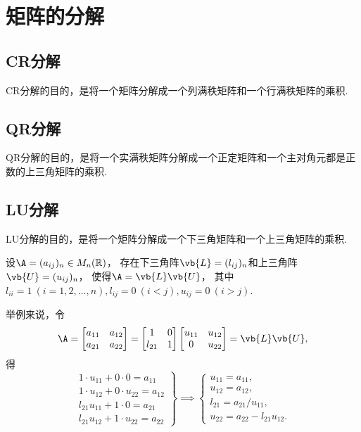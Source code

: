 \section{矩阵的分解}
\subsection{CR分解}
CR分解的目的，是将一个矩阵分解成一个列满秩矩阵和一个行满秩矩阵的乘积.

\subsection{QR分解}
QR分解的目的，是将一个实满秩矩阵分解成一个正定矩阵和一个主对角元都是正数的上三角矩阵的乘积.

\subsection{LU分解}
LU分解的目的，是将一个矩阵分解成一个下三角矩阵和一个上三角矩阵的乘积.

\begingroup
\def\L{\vb{L}}%
\def\U{\vb{U}}%
\begin{theorem}
设\(\A = (a_{ij})_n \in M_n(\mathbb{R})\)，
存在下三角阵\(\L = (l_{ij})_n\)和上三角阵\(\U = (u_{ij})_n\)，
使得\(\A = \L \U\)，
其中\(l_{ii} = 1\ (i=1,2,\dotsc,n),
l_{ij} = 0\ (i<j),
u_{ij} = 0\ (i>j)\).
\end{theorem}

举例来说，令\[
	\A = \begin{bmatrix}
		a_{11} & a_{12} \\
		a_{21} & a_{22}
	\end{bmatrix}
	= \begin{bmatrix}
		1 & 0 \\
		l_{21} & 1
	\end{bmatrix}
	\begin{bmatrix}
		u_{11} & u_{12} \\
		0 & u_{22}
	\end{bmatrix}
	= \L \U,
\]
得\[
	\left.\begin{array}{r}
		1 \cdot u_{11} + 0 \cdot 0 = a_{11} \\
		1 \cdot u_{12} + 0 \cdot u_{22} = a_{12} \\
		l_{21} u_{11} + 1 \cdot 0 = a_{21} \\
		l_{21} u_{12} + 1 \cdot u_{22} = a_{22}
	\end{array}\right\}
	\implies
	\left\{\begin{array}{l}
		u_{11} = a_{11}, \\
		u_{12} = a_{12}, \\
		l_{21} = a_{21} / u_{11}, \\
		u_{22} = a_{22} - l_{21} u_{12}.
	\end{array}\right.
\]

